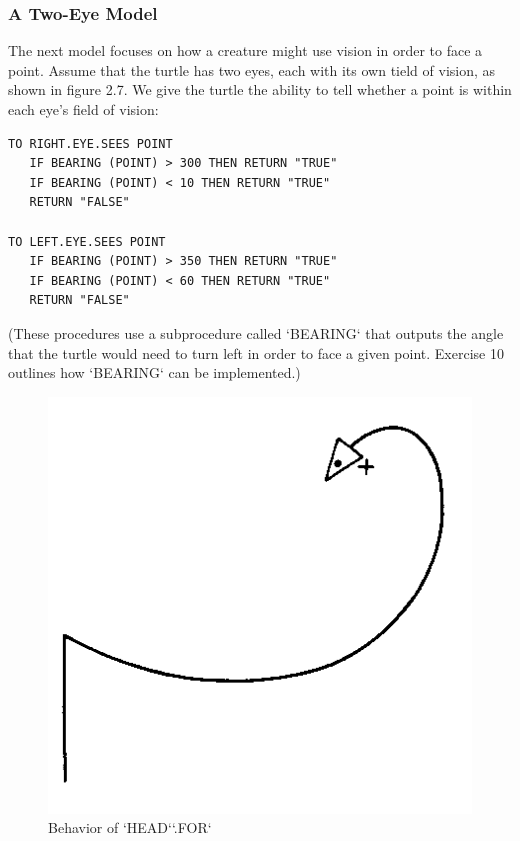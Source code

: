 \documentclass{book}
\begin{document}
\subsubsection{A Two-Eye Model}

The next model focuses on how a creature might use vision in order to
face a point. Assume that the turtle has two eyes, each with its own
tield of vision, as shown in figure 2.7. We give the turtle the ability to
tell whether a point is within each eye's field of vision:

\begin{verbatim}
TO RIGHT.EYE.SEES POINT
   IF BEARING (POINT) > 300 THEN RETURN "TRUE"
   IF BEARING (POINT) < 10 THEN RETURN "TRUE"
   RETURN "FALSE"

TO LEFT.EYE.SEES POINT
   IF BEARING (POINT) > 350 THEN RETURN "TRUE"
   IF BEARING (POINT) < 60 THEN RETURN "TRUE"
   RETURN "FALSE"
\end{verbatim}
\noindent (These procedures use a subprocedure called \textsc{`BEARING`} that outputs the
angle that the turtle would need to turn left in order to face a given
point. Exercise 10 outlines how \textsc{`BEARING`} can be implemented.)


\begin{figure}
\begin{center}
\includegraphics[scale=1]{fig2-8}
\caption{Behavior of \textsc{`HEAD`}\textsc{`.FOR`}}
\end{center}
\end{figure}
\end{document}
